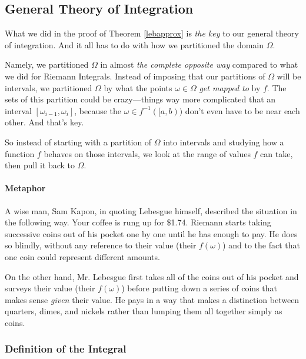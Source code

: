 \documentclass[12pt]{article}
\theoremstyle{plain}
\theoremstyle{definition}
\theoremstyle{remark}
\begin{document}
\subsection{General Theory of Integration}

What we did in the proof of Theorem \ref{lebapprox} is \emph{the key} to
our general theory of integration.  And it all has to do with how we
partitioned the domain $\Omega$.

Namely, we partitioned $\Omega$ in almost
\emph{the complete opposite way} compared to what we did for Riemann
Integrals. Instead of imposing that our partitions of $\Omega$ will be
intervals, we partitioned $\Omega$ by what the points $\omega\in \Omega$
\emph{get mapped to} by $f$. The sets of this partition could be
crazy---things way more complicated that an interval
$[\omega_{i-1}, \omega_i]$, because the $\omega\in f^{-1}([a,b))$ don't even
have to be near each other.  And that's key.

So instead of starting with a partition of $\Omega$ into intervals and
studying how a function $f$ behaves on those intervals, we look at the
range of values $f$ can take, then pull it back to $\Omega$.

\paragraph{Metaphor}
A wise man, Sam Kapon, in quoting Lebesgue himself, described the
situation in the following way. Your coffee is rung up for \$1.74.
Riemann starts taking successive coins out of his pocket one by one
until he has enough to pay. He does so blindly, without any reference to
their value (their $f(\omega)$) and to the fact that one coin could represent
different amounts.

On the other hand, Mr. Lebesgue first takes all of the coins out of his
pocket and surveys their value (their $f(\omega)$) before putting down a
series of coins that makes sense \emph{given} their value. He pays in a
way that makes a distinction between quarters, dimes, and nickels rather
than lumping them all together simply as coins.

\subsubsection{Definition of the Integral}
\end{document}
